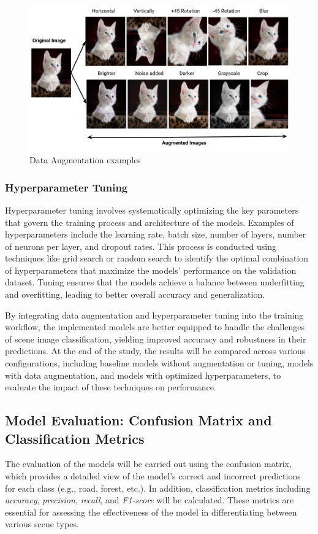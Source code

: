 \begin{figure}[h!]
    \centering
    \includegraphics[width=0.9\linewidth]{images/data_augmentation.png}
    \caption{Data Augmentation examples}
    \label{fig:enter-label}
\end{figure}

\subsubsection{Hyperparameter Tuning}
Hyperparameter tuning involves systematically optimizing the key parameters that govern the training process and architecture of the models. Examples of hyperparameters include the learning rate, batch size, number of layers, number of neurons per layer, and dropout rates. This process is conducted using techniques like grid search or random search to identify the optimal combination of hyperparameters that maximize the models' performance on the validation dataset. Tuning ensures that the models achieve a balance between underfitting and overfitting, leading to better overall accuracy and generalization.

\hfill


By integrating data augmentation and hyperparameter tuning into the training workflow, the implemented models are better equipped to handle the challenges of scene image classification, yielding improved accuracy and robustness in their predictions. At the end of the study, the results will be compared across various configurations, including baseline models without augmentation or tuning, models with data augmentation, and models with optimized hyperparameters, to evaluate the impact of these techniques on performance.



\subsection{Model Evaluation: Confusion Matrix and Classification Metrics}
The evaluation of the models will be carried out using the confusion matrix, which provides a detailed view of the model’s correct and incorrect predictions for each class (e.g., road, forest, etc.). In addition, classification metrics including \textit{accuracy}, \textit{precision}, \textit{recall}, and \textit{F1-score} will be calculated. These metrics are essential for assessing the effectiveness of the model in differentiating between various scene types.

